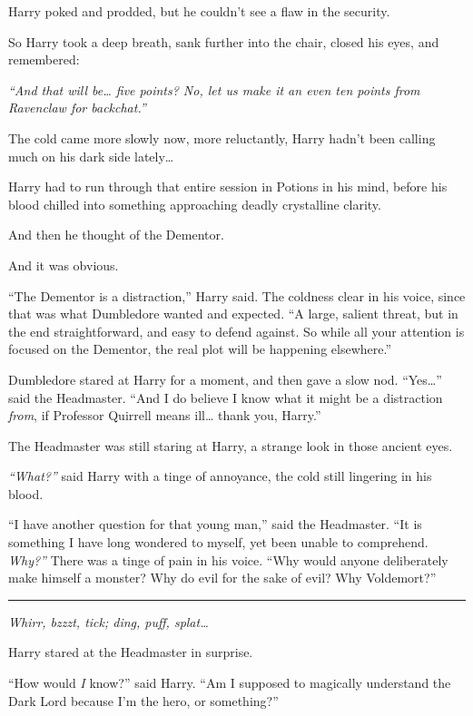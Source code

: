 Harry poked and prodded, but he couldn't see a flaw in the security.

So Harry took a deep breath, sank further into the chair, closed his
eyes, and remembered:

\emph{``And that will be\ldots{} five points? No, let us make it an even
ten points from Ravenclaw for backchat.''}

The cold came more slowly now, more reluctantly, Harry hadn't been
calling much on his dark side lately\ldots{}

Harry had to run through that entire session in Potions in his mind,
before his blood chilled into something approaching deadly crystalline
clarity.

And then he thought of the Dementor.

And it was obvious.

``The Dementor is a distraction,'' Harry said. The coldness clear in his
voice, since that was what Dumbledore wanted and expected. ``A large,
salient threat, but in the end straightforward, and easy to defend
against. So while all your attention is focused on the Dementor, the
real plot will be happening elsewhere.''

Dumbledore stared at Harry for a moment, and then gave a slow nod.
``Yes\ldots{}'' said the Headmaster. ``And I do believe I know what it
might be a distraction \emph{from}, if Professor Quirrell means
ill\ldots{} thank you, Harry.''

The Headmaster was still staring at Harry, a strange look in those
ancient eyes.

\emph{``What?''} said Harry with a tinge of annoyance, the cold still
lingering in his blood.

``I have another question for that young man,'' said the Headmaster.
``It is something I have long wondered to myself, yet been unable to
comprehend. \emph{Why?''} There was a tinge of pain in his voice. ``Why
would anyone deliberately make himself a monster? Why do evil for the
sake of evil? Why Voldemort?''

\begin{center}\rule{3in}{0.4pt}\end{center}

\emph{Whirr, bzzzt, tick; ding, puff, splat\ldots{}}

Harry stared at the Headmaster in surprise.

``How would \emph{I} know?'' said Harry. ``Am I supposed to magically
understand the Dark Lord because I'm the hero, or something?''

